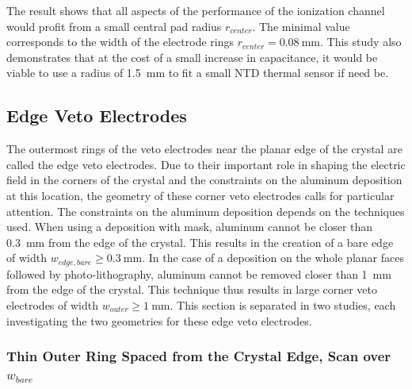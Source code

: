 The result shows that all aspects of the performance of the ionization channel would profit from a small central pad radius $r_{center}$. The minimal value corresponds to the width of the electrode rings $r_{center}=\SI{0.08}{\mm}$. This study also demonstrates that at the cost of a small increase in capacitance, it would be viable to use a radius of \SI{1.5}{\mm} to fit a small NTD thermal sensor if need be.



\subsection{Edge Veto Electrodes}

The outermost rings of the veto electrodes near the planar edge of the crystal are called the edge veto electrodes. Due to their important role in shaping the electric field in the corners of the crystal and the constraints on the aluminum deposition at this location, the geometry of these corner veto electrodes calls for particular attention.
The constraints on the aluminum deposition depends on the techniques used. When using a deposition with mask, aluminum cannot be closer than \SI{0.3}{\mm} from the edge of the crystal. This results in the creation of a bare edge of width $w_{edge, bare} \geq \SI{0.3}{\mm}$. In the case of a deposition on the whole planar faces followed by photo-lithography, aluminum cannot be removed closer than \SI{1}{\mm} from the edge of the crystal. This technique thus results in large corner veto electrodes of width $w_{outer}\geq \SI{1}{\mm}$.
This section is separated in two studies, each investigating the two geometries for these edge veto electrodes.


\subsubsection{Thin Outer Ring Spaced from the Crystal Edge, Scan over $w_{bare}$}

